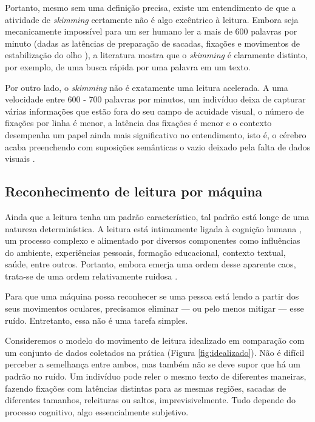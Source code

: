 \documentclass[12pt]{article}
\begin{document}
		Portanto, mesmo sem uma definição precisa, existe um entendimento de que a atividade de \textit{skimming} certamente não é algo excêntrico à leitura. Embora seja mecanicamente impossível para um ser humano ler a mais de 600 palavras por minuto (dadas as latências de preparação de sacadas, fixações e movimentos de estabilização do olho \cite{Reichle-1998}), a literatura mostra que o \textit{skimming} é claramente distinto, por exemplo, de uma busca rápida por uma palavra em um texto.
		
		Por outro lado, o \textit{skimming} não é exatamente uma leitura acelerada. A uma velocidade entre 600 - 700 palavras por minutos, um indivíduo deixa de capturar várias informações que estão fora do seu campo de acuidade visual, o número de fixações por linha é menor, a latência das fixações é menor e o contexto desempenha um papel ainda mais significativo no entendimento, isto é, o cérebro acaba preenchendo com suposições semânticas o vazio deixado pela falta de dados visuais \cite{Rayner-1998}.
		
		
		
		\subsection{Reconhecimento de leitura por máquina}
		Ainda que a leitura tenha um padrão característico, tal padrão está longe de uma natureza determinística. A leitura está intimamente ligada à cognição humana \cite{Rayner-1998}, um processo complexo e alimentado por diversos componentes como influências do ambiente, experiências pessoais, formação educacional, contexto textual, saúde, entre outros. Portanto, embora emerja uma ordem desse aparente caos, trata-se de uma ordem relativamente ruidosa \cite{Lee-1999}.
		
		Para que uma máquina possa reconhecer se uma pessoa está lendo a partir dos seus movimentos oculares, precisamos eliminar --- ou pelo menos mitigar --- esse ruído. Entretanto, essa não é uma tarefa simples. 
		
		Consideremos o modelo do movimento de leitura idealizado em comparação com um conjunto de dados coletados na prática (Figura \ref{fig:idealizado}). Não é difícil perceber a semelhança entre ambos, mas também não se deve supor que há um padrão no ruído. Um indivíduo pode reler o mesmo texto de diferentes maneiras, fazendo fixações com latências distintas para as mesmas regiões, sacadas de diferentes tamanhos, releituras ou saltos, imprevisivelmente. Tudo depende do processo cognitivo, algo essencialmente subjetivo.
		
\end{document}
